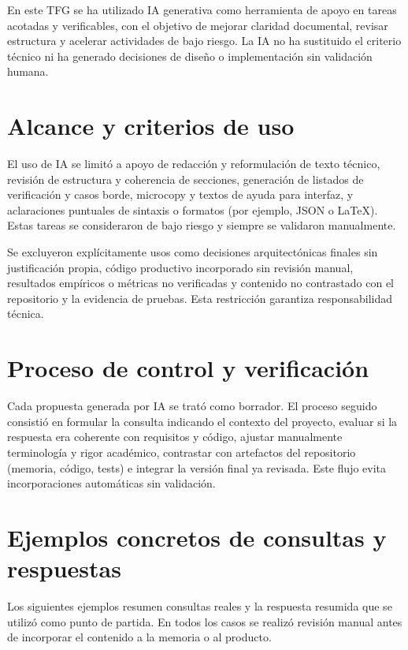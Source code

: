 En este TFG se ha utilizado IA generativa como herramienta de apoyo
en tareas acotadas y verificables, con el objetivo de mejorar claridad
documental, revisar estructura y acelerar actividades de bajo riesgo.
La IA no ha sustituido el criterio t\'ecnico ni ha generado decisiones
de dise\~no o implementaci\'on sin validaci\'on humana.

\section{Alcance y criterios de uso}

El uso de IA se limit\'o a apoyo de redacci\'on y reformulaci\'on de texto t\'ecnico, revisi\'on de estructura y coherencia de secciones, generaci\'on de listados de verificaci\'on y casos borde, microcopy y textos de ayuda para interfaz, y aclaraciones puntuales de sintaxis o formatos (por ejemplo, JSON o \LaTeX{}). Estas tareas se consideraron de bajo riesgo y siempre se validaron manualmente.

Se excluyeron expl\'icitamente usos como decisiones arquitect\'onicas finales sin justificaci\'on propia, c\'odigo productivo incorporado sin revisi\'on manual, resultados emp\'iricos o m\'etricas no verificadas y contenido no contrastado con el repositorio y la evidencia de pruebas. Esta restricci\'on garantiza responsabilidad t\'ecnica.

\section{Proceso de control y verificaci\'on}

Cada propuesta generada por IA se trat\'o como borrador. El proceso seguido consisti\'o en formular la consulta indicando el contexto del proyecto, evaluar si la respuesta era coherente con requisitos y c\'odigo, ajustar manualmente terminolog\'ia y rigor acad\'emico, contrastar con artefactos del repositorio (memoria, c\'odigo, tests) e integrar la versi\'on final ya revisada. Este flujo evita incorporaciones autom\'aticas sin validaci\'on.

\section{Ejemplos concretos de consultas y respuestas}

Los siguientes ejemplos resumen consultas reales y la respuesta resumida
que se utiliz\'o como punto de partida. En todos los casos se realiz\'o
revisi\'on manual antes de incorporar el contenido a la memoria o al producto.

